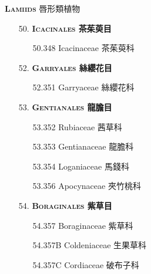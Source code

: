 \vspace{2ex} 
\noindent \normalsize\textsc{\textbf{Lamiids} 唇形類植物}\selectfont \\
\footnotesize\selectfont
\begin{enumerate}
  \item[50. ] \textbf{\textsc{Icacinales} 茶茱萸目}   
    \begin{enumerate}
      \item[50.348] Icacinaceae 茶茱萸科     
        
    \end{enumerate}
  \item[52. ] \textbf{\textsc{Garryales} 絲纓花目}   
    \begin{enumerate}
      \item[52.351] Garryaceae 絲纓花科     
        
    \end{enumerate}
  \item[53. ] \textbf{\textsc{Gentianales} 龍膽目}   
    \begin{enumerate}
      \item[53.352] Rubiaceae 茜草科     
        
      \item[53.353] Gentianaceae 龍膽科     
        
      \item[53.354] Loganiaceae 馬錢科     
        
      \item[53.356] Apocynaceae 夾竹桃科     
        
    \end{enumerate}
  \item[54. ] \textbf{\textsc{Boraginales} 紫草目}   
    \begin{enumerate}
      \item[54.357] Boraginaceae 紫草科     
        
      \item[54.357B] Coldeniaceae 生果草科     
        
      \item[54.357C] Cordiaceae 破布子科     

\end{enumerate}
\end{enumerate}
